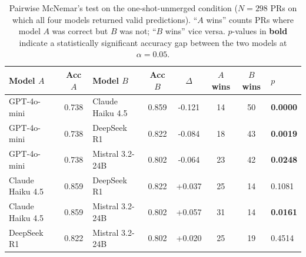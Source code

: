 \begin{table}[!htbp]
\centering
\caption{Pairwise McNemar's test on the one-shot-unmerged condition ($N=298$ PRs on which all four models returned valid predictions). ``$A$ wins'' counts PRs where model $A$ was correct but $B$ was not; ``$B$ wins'' vice versa. $p$-values in \textbf{bold} indicate a statistically significant accuracy gap between the two models at $\alpha = 0.05$.}
\label{tab:mcnemar}
\small
\setlength{\tabcolsep}{4pt}
\begin{tabular}{lclccccl}
\toprule
Model $A$ & Acc $A$ & Model $B$ & Acc $B$ & $\Delta$ & $A$ wins & $B$ wins & $p$ \\
\midrule
GPT-4o-mini & 0.738 & Claude Haiku 4.5 & 0.859 & -0.121 & 14 & 50 & \textbf{0.0000} \\
GPT-4o-mini & 0.738 & DeepSeek R1 & 0.822 & -0.084 & 18 & 43 & \textbf{0.0019} \\
GPT-4o-mini & 0.738 & Mistral 3.2-24B & 0.802 & -0.064 & 23 & 42 & \textbf{0.0248} \\
Claude Haiku 4.5 & 0.859 & DeepSeek R1 & 0.822 & +0.037 & 25 & 14 & 0.1081 \\
Claude Haiku 4.5 & 0.859 & Mistral 3.2-24B & 0.802 & +0.057 & 31 & 14 & \textbf{0.0161} \\
DeepSeek R1 & 0.822 & Mistral 3.2-24B & 0.802 & +0.020 & 25 & 19 & 0.4514 \\
\bottomrule
\end{tabular}
\end{table}
